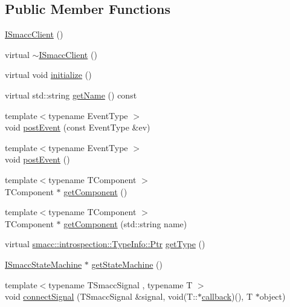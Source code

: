 \subsection*{Public Member Functions}
\begin{DoxyCompactItemize}
\item 
\hyperlink{classsmacc_1_1ISmaccClient_a40222ad8b9b7962755434025b1fd5ae7}{I\+Smacc\+Client} ()
\item 
virtual \hyperlink{classsmacc_1_1ISmaccClient_a030e17771bf2e404a6fad97273c4d7f4}{$\sim$\+I\+Smacc\+Client} ()
\item 
virtual void \hyperlink{classsmacc_1_1ISmaccClient_a974ebb6ad6cf812e7b9de6b78b3d901f}{initialize} ()
\item 
virtual std\+::string \hyperlink{classsmacc_1_1ISmaccClient_a8c3ce19f182e71909c5dc6263d25be69}{get\+Name} () const
\item 
{\footnotesize template$<$typename Event\+Type $>$ }\\void \hyperlink{classsmacc_1_1ISmaccClient_a46cbc0d695214efe40d29247323bfc80}{post\+Event} (const Event\+Type \&ev)
\item 
{\footnotesize template$<$typename Event\+Type $>$ }\\void \hyperlink{classsmacc_1_1ISmaccClient_a21a79203cb44fc717d4d977c190327c6}{post\+Event} ()
\item 
{\footnotesize template$<$typename T\+Component $>$ }\\T\+Component $\ast$ \hyperlink{classsmacc_1_1ISmaccClient_adef78db601749ca63c19e74a27cb88cc}{get\+Component} ()
\item 
{\footnotesize template$<$typename T\+Component $>$ }\\T\+Component $\ast$ \hyperlink{classsmacc_1_1ISmaccClient_ad72cba3ce7c5b3bd3977747dc6d5fb69}{get\+Component} (std\+::string name)
\item 
virtual \hyperlink{classsmacc_1_1introspection_1_1TypeInfo_aa6ffd9c39811d59f7c771941b7fad860}{smacc\+::introspection\+::\+Type\+Info\+::\+Ptr} \hyperlink{classsmacc_1_1ISmaccClient_ae7faf4e40510c73810e6b0ef9fec8f33}{get\+Type} ()
\item 
\hyperlink{classsmacc_1_1ISmaccStateMachine}{I\+Smacc\+State\+Machine} $\ast$ \hyperlink{classsmacc_1_1ISmaccClient_aec51d4712404cb9882b86e4c854bb93a}{get\+State\+Machine} ()
\item 
{\footnotesize template$<$typename T\+Smacc\+Signal , typename T $>$ }\\void \hyperlink{classsmacc_1_1ISmaccClient_addce4ebcdebc5a7a3f80c0980862575d}{connect\+Signal} (T\+Smacc\+Signal \&signal, void(T\+::$\ast$\hyperlink{3_2servers_2opencv__perception__node_2opencv__perception__node_8cpp_a050e697bd654facce10ea3f6549669b3}{callback})(), T $\ast$object)

\end{DoxyCompactItemize}
